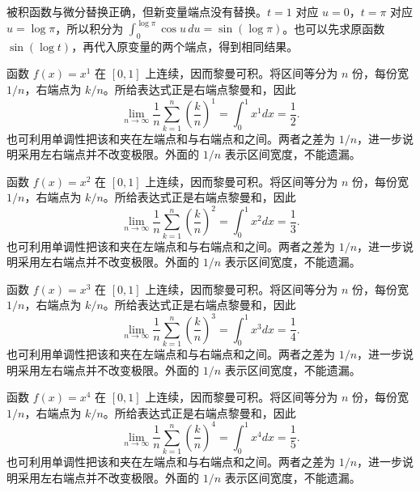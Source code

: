 \documentclass[UTF8,12pt,a4paper,fontset=fandol]{ctexart}
\begin{document}
\begin{solve}\label{ans:c17q2}
被积函数与微分替换正确，但新变量端点没有替换。$t=1$ 对应 $u=0$，$t=\pi$ 对应 $u=\log\pi$，所以积分为 $\int_0^{\log\pi}\cos u\,du=\sin(\log\pi)$。也可以先求原函数 $\sin(\log t)$，再代入原变量的两个端点，得到相同结果。
\end{solve}

\begin{solve}\label{ans:c17q3}
函数 $f(x)=x^{1}$ 在 $[0,1]$ 上连续，因而黎曼可积。将区间等分为 $n$ 份，每份宽 $1/n$，右端点为 $k/n$。所给表达式正是右端点黎曼和，因此
\[
\lim_{n\to\infty}\frac1n\sum_{k=1}^n\left(\frac kn\right)^{1}=\int_0^1x^{1}dx=\frac{1}{2}.
\]
也可利用单调性把该和夹在左端点和与右端点和之间。两者之差为 $1/n$，进一步说明采用左右端点并不改变极限。外面的 $1/n$ 表示区间宽度，不能遗漏。
\end{solve}

\begin{solve}\label{ans:c17q4}
函数 $f(x)=x^{2}$ 在 $[0,1]$ 上连续，因而黎曼可积。将区间等分为 $n$ 份，每份宽 $1/n$，右端点为 $k/n$。所给表达式正是右端点黎曼和，因此
\[
\lim_{n\to\infty}\frac1n\sum_{k=1}^n\left(\frac kn\right)^{2}=\int_0^1x^{2}dx=\frac{1}{3}.
\]
也可利用单调性把该和夹在左端点和与右端点和之间。两者之差为 $1/n$，进一步说明采用左右端点并不改变极限。外面的 $1/n$ 表示区间宽度，不能遗漏。
\end{solve}

\begin{solve}\label{ans:c17q5}
函数 $f(x)=x^{3}$ 在 $[0,1]$ 上连续，因而黎曼可积。将区间等分为 $n$ 份，每份宽 $1/n$，右端点为 $k/n$。所给表达式正是右端点黎曼和，因此
\[
\lim_{n\to\infty}\frac1n\sum_{k=1}^n\left(\frac kn\right)^{3}=\int_0^1x^{3}dx=\frac{1}{4}.
\]
也可利用单调性把该和夹在左端点和与右端点和之间。两者之差为 $1/n$，进一步说明采用左右端点并不改变极限。外面的 $1/n$ 表示区间宽度，不能遗漏。
\end{solve}

\begin{solve}\label{ans:c17q6}
函数 $f(x)=x^{4}$ 在 $[0,1]$ 上连续，因而黎曼可积。将区间等分为 $n$ 份，每份宽 $1/n$，右端点为 $k/n$。所给表达式正是右端点黎曼和，因此
\[
\lim_{n\to\infty}\frac1n\sum_{k=1}^n\left(\frac kn\right)^{4}=\int_0^1x^{4}dx=\frac{1}{5}.
\]
也可利用单调性把该和夹在左端点和与右端点和之间。两者之差为 $1/n$，进一步说明采用左右端点并不改变极限。外面的 $1/n$ 表示区间宽度，不能遗漏。
\end{solve}
\end{document}
